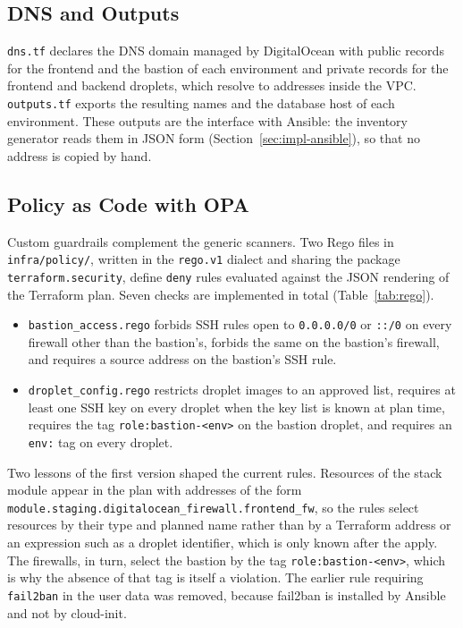 \subsection{DNS and Outputs}

\texttt{dns.tf} declares the DNS domain managed by DigitalOcean with public records for the frontend and the bastion of each environment and private records for the frontend and backend droplets, which resolve to addresses inside the VPC. \texttt{outputs.tf} exports the resulting names and the database host of each environment. These outputs are the interface with Ansible: the inventory generator reads them in JSON form (Section~\ref{sec:impl-ansible}), so that no address is copied by hand.

\subsection{Policy as Code with OPA}

Custom guardrails complement the generic scanners. Two Rego files in \texttt{infra/policy/}, written in the \texttt{rego.v1} dialect and sharing the package \texttt{terraform.security}, define \texttt{deny} rules evaluated against the JSON rendering of the Terraform plan. Seven checks are implemented in total (Table~\ref{tab:rego}).
\begin{itemize}
  \item \texttt{bastion\_access.rego} forbids SSH rules open to \texttt{0.0.0.0/0} or \texttt{::/0} on every firewall other than the bastion's, forbids the same on the bastion's firewall, and requires a source address on the bastion's SSH rule.
  \item \texttt{droplet\_config.rego} restricts droplet images to an approved list, requires at least one SSH key on every droplet when the key list is known at plan time, requires the tag \texttt{role:bastion-<env>} on the bastion droplet, and requires an \texttt{env:} tag on every droplet.
\end{itemize}
Two lessons of the first version shaped the current rules. Resources of the stack module appear in the plan with addresses of the form \texttt{module.staging.digitalocean\_firewall.frontend\_fw}, so the rules select resources by their type and planned name rather than by a Terraform address or an expression such as a droplet identifier, which is only known after the apply. The firewalls, in turn, select the bastion by the tag \texttt{role:bastion-<env>}, which is why the absence of that tag is itself a violation. The earlier rule requiring \texttt{fail2ban} in the user data was removed, because fail2ban is installed by Ansible and not by cloud-init.


